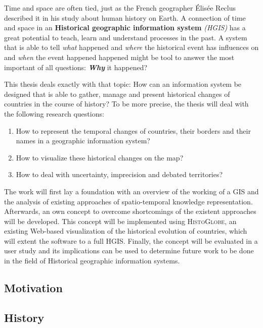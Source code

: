 Time and space are often tied, just as the French geographer Élisée Reclus described it in his study about human history on Earth. A connection of time and space in an \textbf{Historical geographic information system} \emph{(HGIS)} has a great potential to teach, learn and understand processes in the past. A system that is able to tell \emph{what} happened and \emph{where} the historical event has influences on and \emph{when} the event happened happened might be tool to answer the most important of all questions: \textbf{\emph{Why}} it happened?

This thesis deals exactly with that topic: How can an information system be designed that is able to gather, manage and present historical changes of countries in the course of history? To be more precise, the thesis will deal with the following research questions:

\begin{enumerate}
  \item How to represent the temporal changes of countries, their borders and their names in a geographic information system?
  \item How to visualize these historical changes on the map?
  \item How to deal with uncertainty, imprecision and debated territories?
\end{enumerate}

The work will first lay a foundation with an overview of the working of a GIS and the analysis of existing approaches of spatio-temporal knowledge representation. Afterwards, an own concept to overcome shortcomings of the existent approaches will be developed. This concept will be implemented using \textsc{HistoGlobe}, an existing Web-based visualization of the historical evolution of countries, which will extent the software to a full HGIS. Finally, the concept will be evaluated in a user study and its implications can be used to determine future work to be done in the field of Historical geographic information systems.

\subsection{Motivation} %
\label{sub:motivation}



\subsection{History} %
\label{sub:history}

